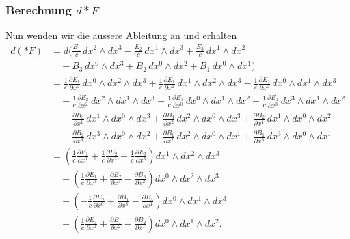 \subsubsection{Berechnung $d \ast F$}
Nun wenden wir die äussere Ableitung an und erhalten
\begin{align*}
	d(\ast F)
	&= d \Bigg(
	\frac{E_{1}}{c} \, dx^2 \wedge dx^3
	- \frac{E_{2}}{c} \, dx^1 \wedge dx^3
	+ \frac{E_{3}}{c} \, dx^1 \wedge dx^2 \\
	&\quad
	+ B_3 \, dx^0 \wedge dx^3
	+ B_2 \, dx^0 \wedge dx^2
	+ B_1 \, dx^0 \wedge dx^1
	\Bigg) \\[1ex]
	&= \frac{1}{c} \frac{\partial E_1}{\partial x^0} \, dx^0 \wedge dx^2 \wedge dx^3
	+ \frac{1}{c} \frac{\partial E_1}{\partial x^1} \, dx^1 \wedge dx^2 \wedge dx^3
	- \frac{1}{c} \frac{\partial E_2}{\partial x^0} \, dx^0 \wedge dx^1 \wedge dx^3 \\
	&\quad
	- \frac{1}{c} \frac{\partial E_2}{\partial x^2} \, dx^2 \wedge dx^1 \wedge dx^3
	+ \frac{1}{c} \frac{\partial E_3}{\partial x^0} \, dx^0 \wedge dx^1 \wedge dx^2
	+ \frac{1}{c} \frac{\partial E_3}{\partial x^3} \, dx^3 \wedge dx^1 \wedge dx^2 \\
	&\quad
	+ \frac{\partial B_3}{\partial x^1} \, dx^1 \wedge dx^0 \wedge dx^3
	+ \frac{\partial B_3}{\partial x^2} \, dx^2 \wedge dx^0 \wedge dx^3
	+ \frac{\partial B_2}{\partial x^1} \, dx^1 \wedge dx^0 \wedge dx^2 \\
	&\quad
	+ \frac{\partial B_2}{\partial x^3} \, dx^3 \wedge dx^0 \wedge dx^2
	+ \frac{\partial B_1}{\partial x^2} \, dx^2 \wedge dx^0 \wedge dx^1
	+ \frac{\partial B_1}{\partial x^3} \, dx^3 \wedge dx^0 \wedge dx^1 \\[2ex]
	&= \left(
	\frac{1}{c} \frac{\partial E_1}{\partial x^1}
	+ \frac{1}{c} \frac{\partial E_2}{\partial x^2}
	+ \frac{1}{c} \frac{\partial E_3}{\partial x^3}
	\right) dx^1 \wedge dx^2 \wedge dx^3 \\
	&\quad
	+ \left(
	\frac{1}{c} \frac{\partial E_1}{\partial x^0}
	+ \frac{\partial B_2}{\partial x^3}
	- \frac{\partial B_3}{\partial x^2}
	\right) dx^0 \wedge dx^2 \wedge dx^3 \\
	&\quad
	+ \left(
	-\frac{1}{c} \frac{\partial E_2}{\partial x^0}
	+ \frac{\partial B_1}{\partial x^3}
	- \frac{\partial B_3}{\partial x^1}
	\right) dx^0 \wedge dx^1 \wedge dx^3 \\
	&\quad
	+ \left(
	\frac{1}{c} \frac{\partial E_3}{\partial x^0}
	+ \frac{\partial B_1}{\partial x^2}
	- \frac{\partial B_2}{\partial x^1}
	\right) dx^0 \wedge dx^1 \wedge dx^2.
\end{align*}
